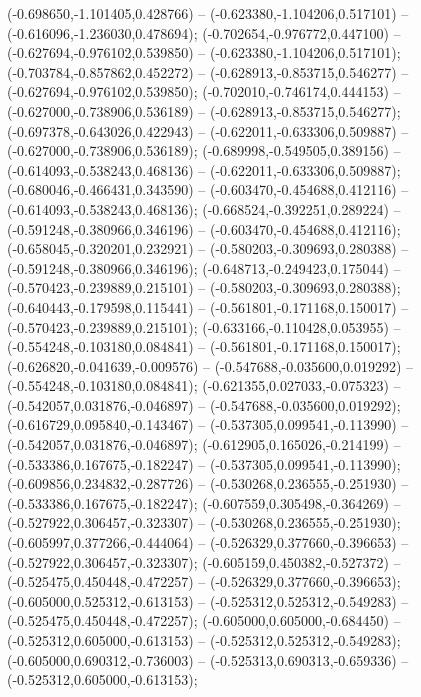  (-0.698650,-1.101405,0.428766) -- (-0.623380,-1.104206,0.517101) -- (-0.616096,-1.236030,0.478694);
 (-0.702654,-0.976772,0.447100) -- (-0.627694,-0.976102,0.539850) -- (-0.623380,-1.104206,0.517101);
 (-0.703784,-0.857862,0.452272) -- (-0.628913,-0.853715,0.546277) -- (-0.627694,-0.976102,0.539850);
 (-0.702010,-0.746174,0.444153) -- (-0.627000,-0.738906,0.536189) -- (-0.628913,-0.853715,0.546277);
 (-0.697378,-0.643026,0.422943) -- (-0.622011,-0.633306,0.509887) -- (-0.627000,-0.738906,0.536189);
 (-0.689998,-0.549505,0.389156) -- (-0.614093,-0.538243,0.468136) -- (-0.622011,-0.633306,0.509887);
 (-0.680046,-0.466431,0.343590) -- (-0.603470,-0.454688,0.412116) -- (-0.614093,-0.538243,0.468136);
 (-0.668524,-0.392251,0.289224) -- (-0.591248,-0.380966,0.346196) -- (-0.603470,-0.454688,0.412116);
 (-0.658045,-0.320201,0.232921) -- (-0.580203,-0.309693,0.280388) -- (-0.591248,-0.380966,0.346196);
 (-0.648713,-0.249423,0.175044) -- (-0.570423,-0.239889,0.215101) -- (-0.580203,-0.309693,0.280388);
 (-0.640443,-0.179598,0.115441) -- (-0.561801,-0.171168,0.150017) -- (-0.570423,-0.239889,0.215101);
 (-0.633166,-0.110428,0.053955) -- (-0.554248,-0.103180,0.084841) -- (-0.561801,-0.171168,0.150017);
 (-0.626820,-0.041639,-0.009576) -- (-0.547688,-0.035600,0.019292) -- (-0.554248,-0.103180,0.084841);
 (-0.621355,0.027033,-0.075323) -- (-0.542057,0.031876,-0.046897) -- (-0.547688,-0.035600,0.019292);
 (-0.616729,0.095840,-0.143467) -- (-0.537305,0.099541,-0.113990) -- (-0.542057,0.031876,-0.046897);
 (-0.612905,0.165026,-0.214199) -- (-0.533386,0.167675,-0.182247) -- (-0.537305,0.099541,-0.113990);
 (-0.609856,0.234832,-0.287726) -- (-0.530268,0.236555,-0.251930) -- (-0.533386,0.167675,-0.182247);
 (-0.607559,0.305498,-0.364269) -- (-0.527922,0.306457,-0.323307) -- (-0.530268,0.236555,-0.251930);
 (-0.605997,0.377266,-0.444064) -- (-0.526329,0.377660,-0.396653) -- (-0.527922,0.306457,-0.323307);
 (-0.605159,0.450382,-0.527372) -- (-0.525475,0.450448,-0.472257) -- (-0.526329,0.377660,-0.396653);
 (-0.605000,0.525312,-0.613153) -- (-0.525312,0.525312,-0.549283) -- (-0.525475,0.450448,-0.472257);
 (-0.605000,0.605000,-0.684450) -- (-0.525312,0.605000,-0.613153) -- (-0.525312,0.525312,-0.549283);
 (-0.605000,0.690312,-0.736003) -- (-0.525313,0.690313,-0.659336) -- (-0.525312,0.605000,-0.613153);
